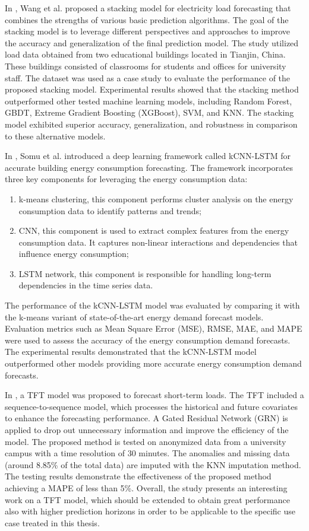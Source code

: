 In \cite{WANG2020114561}, Wang et al. proposed a stacking model for electricity load forecasting that combines the strengths of various basic prediction algorithms.
The goal of the stacking model is to leverage different perspectives and approaches to improve the accuracy and generalization of the final prediction model.
The study utilized load data obtained from two educational buildings located in Tianjin, China.
These buildings consisted of classrooms for students and offices for university staff.
The dataset was used as a case study to evaluate the performance of the proposed stacking model.
Experimental results showed that the stacking method outperformed other tested machine learning models, including Random Forest, GBDT, Extreme Gradient Boosting (XGBoost), SVM, and KNN.
The stacking model exhibited superior accuracy, generalization, and robustness in comparison to these alternative models.

In \cite{SOMU2021110591}, Somu et al. introduced a deep learning framework called kCNN-LSTM for accurate building energy consumption forecasting.
The framework incorporates three key components for leveraging the energy consumption data:
\begin{enumerate}
  \item k-means clustering, this component performs cluster analysis on the energy consumption data to identify patterns and trends;
  \item CNN, this component is used to extract complex features from the energy consumption data. It captures non-linear interactions and dependencies that influence energy consumption;
  \item LSTM network, this component is responsible for handling long-term dependencies in the time series data.
\end{enumerate}
The performance of the kCNN-LSTM model was evaluated by comparing it with the k-means variant of state-of-the-art energy demand forecast models.
Evaluation metrics such as Mean Square Error (MSE), RMSE, MAE, and MAPE were used to assess the accuracy of the energy consumption demand forecasts.
The experimental results demonstrated that the kCNN-LSTM model outperformed other models providing more accurate energy consumption demand forecasts.

In \cite{10033079}, a TFT model was proposed to forecast short-term loads.
The TFT included a sequence-to-sequence model, which processes the historical and future covariates to enhance the forecasting performance.
A Gated Residual Network (GRN) is applied to drop out unnecessary information and improve the efficiency of the model.
The proposed method is tested on anonymized data from a university campus with a time resolution of 30 minutes.
The anomalies and missing data (around 8.85\% of the total data) are imputed with the KNN imputation method.
The testing results demonstrate the effectiveness of the proposed method achieving a MAPE of less than 5\%.
Overall, the study presents an interesting work on a TFT model, which should be extended to obtain great performance also with higher prediction horizons in order to be applicable to the specific use case treated in this thesis.

